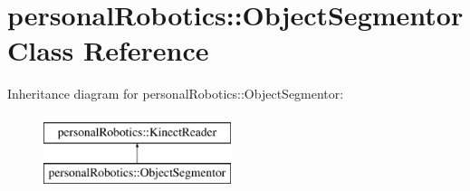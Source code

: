 \hypertarget{classpersonal_robotics_1_1_object_segmentor}{}\section{personal\+Robotics\+:\+:Object\+Segmentor Class Reference}
\label{classpersonal_robotics_1_1_object_segmentor}
Inheritance diagram for personal\+Robotics\+:\+:Object\+Segmentor\+:\begin{figure}[H]
\begin{center}
\leavevmode
\includegraphics[height=2.000000cm]{d5/d3a/classpersonal_robotics_1_1_object_segmentor}
\end{center}
\end{figure}
